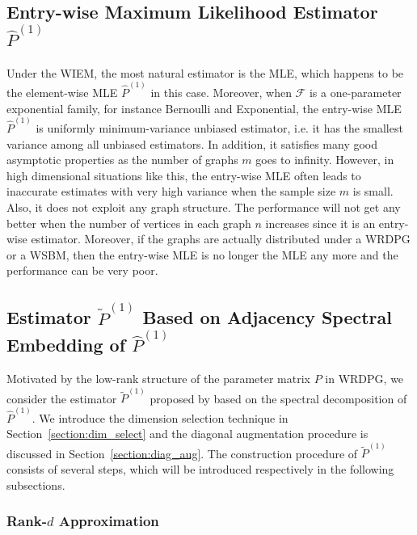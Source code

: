 \documentclass[a4paper]{article}
\renewcommand{\hat}{\widehat}
\begin{document}
\subsection{Entry-wise Maximum Likelihood Estimator $\hat{P}^{(1)}$}

Under the WIEM, the most natural estimator is the MLE, which happens to be the element-wise MLE $\hat{P}^{(1)}$ in this case.
Moreover, when $\mathcal{F}$ is a one-parameter exponential family, for instance Bernoulli and Exponential, the entry-wise MLE $\hat{P}^{(1)}$ is uniformly minimum-variance unbiased estimator, i.e. it has the smallest variance among all unbiased estimators. In addition, it satisfies many good asymptotic properties as the number of graphs $m$ goes to infinity.
However, in high dimensional situations like this, the entry-wise MLE often leads to inaccurate estimates with very high variance when the sample size $m$ is small. Also, it does not exploit any graph structure. The performance will not get any better when the number of vertices in each graph $n$ increases since it is an entry-wise estimator. Moreover, if the graphs are actually distributed under a WRDPG or a WSBM, then the entry-wise MLE is no longer the MLE any more and the performance can be very poor.


\subsection{Estimator $\widetilde{P}^{(1)}$ Based on Adjacency Spectral Embedding of $\hat{P}^{(1)}$}

Motivated by the low-rank structure of the parameter matrix $P$ in WRDPG, we consider the estimator $\widetilde{P}^{(1)}$ proposed by \citet{tang2016law} based on the spectral decomposition of $\hat{P}^{(1)}$.
We introduce the dimension selection technique in Section~\ref{section:dim_select} and the diagonal augmentation procedure is discussed in Section~\ref{section:diag_aug}. The construction procedure of $\widetilde{P}^{(1)}$ consists of several steps, which will be introduced respectively in the following subsections.

\subsubsection{Rank-$d$ Approximation}
\end{document}

